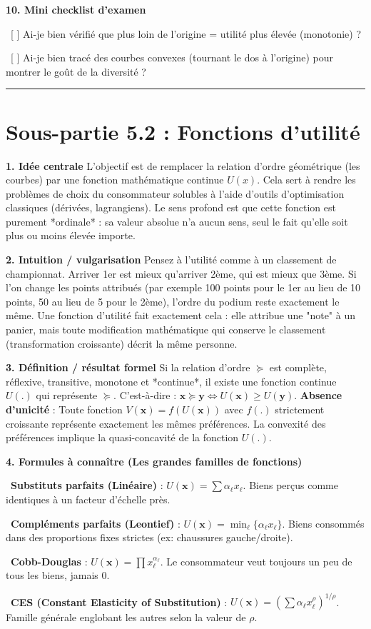 \documentclass[11pt, a4paper]{report}
\begin{document}
\textbf{10. Mini checklist d’examen}
\par \textbullet\ [ ] Ai-je bien vérifié que plus loin de l'origine = utilité plus élevée (monotonie) ?
\par \textbullet\ [ ] Ai-je bien tracé des courbes convexes (tournant le dos à l'origine) pour montrer le goût de la diversité ?

\vspace{1cm}\hrule\vspace{1cm}

\section{Sous-partie 5.2 : Fonctions d'utilité}

\textbf{1. Idée centrale}
L'objectif est de remplacer la relation d'ordre géométrique (les courbes) par une fonction mathématique continue $U(x)$. Cela sert à rendre les problèmes de choix du consommateur solubles à l'aide d'outils d'optimisation classiques (dérivées, lagrangiens). Le sens profond est que cette fonction est purement *ordinale* : sa valeur absolue n'a aucun sens, seul le fait qu'elle soit plus ou moins élevée importe.

\textbf{2. Intuition / vulgarisation}
Pensez à l'utilité comme à un classement de championnat. Arriver 1er est mieux qu'arriver 2ème, qui est mieux que 3ème. Si l'on change les points attribués (par exemple 100 points pour le 1er au lieu de 10 points, 50 au lieu de 5 pour le 2ème), l'ordre du podium reste exactement le même. Une fonction d'utilité fait exactement cela : elle attribue une "note" à un panier, mais toute modification mathématique qui conserve le classement (transformation croissante) décrit la même personne.

\textbf{3. Définition / résultat formel}
Si la relation d'ordre $\succeq$ est complète, réflexive, transitive, monotone et *continue*, il existe une fonction continue $U(.)$ qui représente $\succeq$.
C'est-à-dire : $\mathbf{x} \succeq \mathbf{y} \iff U(\mathbf{x}) \ge U(\mathbf{y})$.
\textbf{Absence d'unicité} : Toute fonction $V(\mathbf{x}) = f(U(\mathbf{x}))$ avec $f(.)$ strictement croissante représente exactement les mêmes préférences.
La convexité des préférences implique la quasi-concavité de la fonction $U(.)$.

\textbf{4. Formules à connaître (Les grandes familles de fonctions)}
\par \textbullet\ \textbf{Substituts parfaits (Linéaire)} : $U(\mathbf{x}) = \sum \alpha_\ell x_\ell$. Biens perçus comme identiques à un facteur d'échelle près.
\par \textbullet\ \textbf{Compléments parfaits (Leontief)} : $U(\mathbf{x}) = \min_\ell \{\alpha_\ell x_\ell\}$. Biens consommés dans des proportions fixes strictes (ex: chaussures gauche/droite).
\par \textbullet\ \textbf{Cobb-Douglas} : $U(\mathbf{x}) = \prod x_\ell^{\alpha_\ell}$. Le consommateur veut toujours un peu de tous les biens, jamais 0.
\par \textbullet\ \textbf{CES (Constant Elasticity of Substitution)} : $U(\mathbf{x}) = (\sum \alpha_\ell x_\ell^\rho)^{1/\rho}$. Famille générale englobant les autres selon la valeur de $\rho$.
\end{document}
